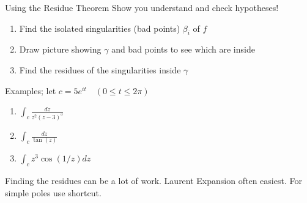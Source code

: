 \documentclass{beamer}
\begin{document}
\begin{frame}{Using the Residue Theorem}
Show you understand and \alert{check hypotheses}!

\begin{enumerate}
    \item Find the isolated singularities (bad points) $\beta_i$ of $f$ 
    \item Draw picture showing $\gamma$ and bad points to see which are inside
    \item Find the residues of the singularities inside $\gamma$
\end{enumerate}
\begin{block}{Examples; let  $c=5e^{it}\quad (0\leq t\leq 2\pi)$}
\begin{enumerate}
\item $\int_c\frac{dz}{z^2(z-3)^3}$
\item $\int_c \frac{dz}{\tan(z)}$
\item $\int_c z^3\cos(1/z)dz$
\end{enumerate}
\end{block}
\begin{block}{Finding the residues can be a lot of work.}
Laurent Expansion often easiest. For simple poles use shortcut.
\end{block}


\end{frame}
\end{document}
